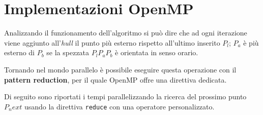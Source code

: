 \section{Implementazioni OpenMP}
Analizzando il funzionamento dell'algoritmo si può dire che ad ogni iterazione viene aggiunto all'\emph{hull} il punto più esterno rispetto all'ultimo inserito $P_l$;
$P_a$ è più esterno di $P_b$ se la spezzata $P_lP_aP_b$ è orientata in senso orario.

Tornando nel mondo parallelo è possibile eseguire questa operazione con il \textbf{pattern reduction}, per il quale OpenMP offre una direttiva dedicata.

Di seguito sono riportati i tempi parallelizzando la ricerca del prossimo punto $P_next$ usando la direttiva \texttt{reduce} con una operatore personalizzato.
